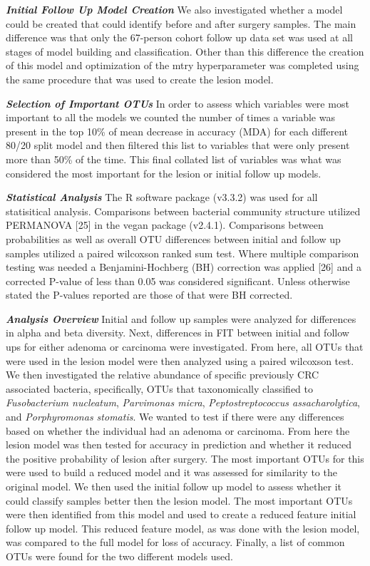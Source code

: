 \documentclass[12pt,]{article}
\begin{document}
\textbf{\emph{Initial Follow Up Model Creation}} We also investigated
whether a model could be created that could identify before and after
surgery samples. The main difference was that only the 67-person cohort
follow up data set was used at all stages of model building and
classification. Other than this difference the creation of this model
and optimization of the mtry hyperparameter was completed using the same
procedure that was used to create the lesion model.

\textbf{\emph{Selection of Important OTUs}} In order to assess which
variables were most important to all the models we counted the number of
times a variable was present in the top 10\% of mean decrease in
accuracy (MDA) for each different 80/20 split model and then filtered
this list to variables that were only present more than 50\% of the
time. This final collated list of variables was what was considered the
most important for the lesion or initial follow up models.

\textbf{\emph{Statistical Analysis}} The R software package (v3.3.2) was
used for all statisitical analysis. Comparisons between bacterial
community structure utilized PERMANOVA {[}25{]} in the vegan package
(v2.4.1). Comparisons between probabilities as well as overall OTU
differences between initial and follow up samples utilized a paired
wilcoxson ranked sum test. Where multiple comparison testing was needed
a Benjamini-Hochberg (BH) correction was applied {[}26{]} and a
corrected P-value of less than 0.05 was considered significant. Unless
otherwise stated the P-values reported are those of that were BH
corrected.

\textbf{\emph{Analysis Overview}} Initial and follow up samples were
analyzed for differences in alpha and beta diversity. Next, differences
in FIT between initial and follow ups for either adenoma or carcinoma
were investigated. From here, all OTUs that were used in the lesion
model were then analyzed using a paired wilcoxson test. We then
investigated the relative abundance of specific previously CRC
associated bacteria, specifically, OTUs that taxonomically classified to
\emph{Fusobacterium nucleatum}, \emph{Parvimonas micra},
\emph{Peptostreptococcus assacharolytica}, and \emph{Porphyromonas
stomatis}. We wanted to test if there were any differences based on
whether the individual had an adenoma or carcinoma. From here the lesion
model was then tested for accuracy in prediction and whether it reduced
the positive probability of lesion after surgery. The most important
OTUs for this were used to build a reduced model and it was assessed for
similarity to the original model. We then used the initial follow up
model to assess whether it could classify samples better then the lesion
model. The most important OTUs were then identified from this model and
used to create a reduced feature initial follow up model. This reduced
feature model, as was done with the lesion model, was compared to the
full model for loss of accuracy. Finally, a list of common OTUs were
found for the two different models used.
\end{document}
